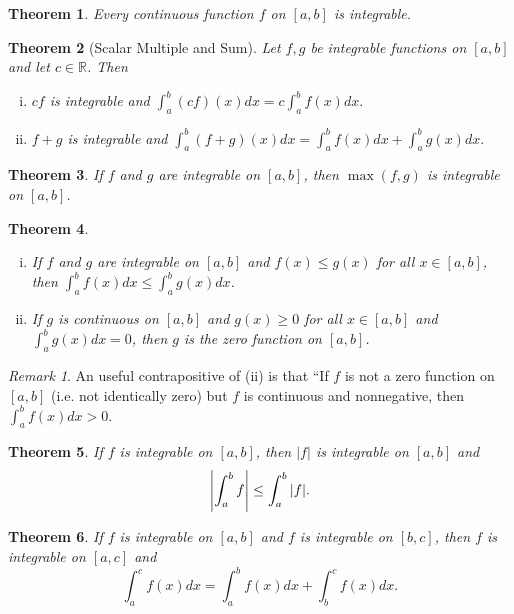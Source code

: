 \documentclass[12pt, lettersize]{book}
\theoremstyle{plain}
\newtheorem{thm}{Theorem}[section]
\theoremstyle{definition}
\theoremstyle{remark}
\newtheorem*{rem}{Remark}
\newcommand{\R}{\mathbb{R}}
\begin{document}
	\begin{thm}
		Every continuous function $f$ on $[a,b]$ is integrable.
	\end{thm}
	
	\begin{thm}[Scalar Multiple and Sum]
		Let $f,g$ be integrable functions on $[a,b]$ and let $c\in\R$. Then
		\begin{enumerate}[(i)]
			\item $cf$ is integrable and $\int_{a}^{b}(cf)(x)dx=c\int_{a}^{b}f(x)dx.$
			\item $f+g$ is integrable and $\int_{a}^{b}(f+g)(x)dx=\int_{a}^{b}f(x)dx+\int_{a}^{b}g(x)dx.$
		\end{enumerate}
	\end{thm}
	
	\begin{thm}
		If $f$ and $g$ are integrable on $[a,b]$, then $\max(f,g)$ is integrable on $[a,b]$.
	\end{thm}
	
	\begin{thm}
		\begin{enumerate}[(i)]
			\item If $f$ and $g$ are integrable on $[a,b]$ and $f(x)\leq g(x)$ for all $x\in[a,b]$, then $\int_{a}^{b}f(x)dx\leq\int_{a}^{b}g(x)dx$.
			\item If $g$ is continuous on $[a,b]$ and $g(x)\geq 0$ for all $x\in[a,b]$ and $\int_{a}^{b}g(x)dx=0$, then $g$ is the zero function on $[a,b]$.
		\end{enumerate}
	\end{thm}
	\begin{rem}
		An useful contrapositive of (ii) is that ``If $f$ is not a zero function on $[a,b]$ (i.e. not identically zero) but $f$ is continuous and nonnegative, then $\int_{a}^{b}f(x)dx>0$.  
	\end{rem}
	
	\begin{thm}
		If $f$ is integrable on $[a,b]$, then $|f|$ is integrable on $[a,b]$ and
		\begin{displaymath}
			\abs{\int_{a}^{b}f}\leq\int_{a}^{b}\abs{f}.
		\end{displaymath}
	\end{thm}
	
	\begin{thm}
		If $f$ is integrable on $[a,b]$ and $f$ is integrable on $[b,c]$, then $f$ is integrable on $[a,c]$ and 
		\begin{displaymath}
			\int_{a}^{c}f(x)dx=\int_{a}^{b}f(x)dx+\int_{b}^{c}f(x)dx.
		\end{displaymath}
	\end{thm}
	
\end{document}
